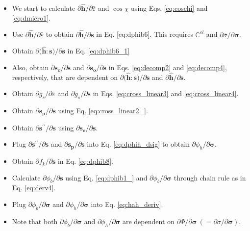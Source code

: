 \documentclass[12pt]{amsart}
\begin{document}
\begin{itemize}
\item We start to calculate $\partial \hat{\mathbf{h}}/\partial \bar{\varepsilon}$ and $\cos\chi$ using Eqs. \ref{eq:coschi} and \ref{eq:dmicro1}.
\item Use $\partial \hat{\mathbf{h}}/\partial \bar{\varepsilon}$ to obtain $\partial \hat{\mathbf{h}}/\partial \mathbf{s}$ in Eq. \ref{eq:dphib6}. This requires $\mathbb{C}^{el}$ and $\partial\bar{\sigma}/\partial\mathbf{\sigma}$.
\item Obtain $\partial\big(\hat{\mathbf{h}}:\mathbf{s}\big)/\partial \mathbf{s}$ in Eq. \ref{eq:dphib6_1}
\item Also, obtain $\partial \mathbf{s_c}/\partial \mathbf{s}$ and $\partial \mathbf{s_o}/\partial\mathbf{s}$ in Eqs. \ref{eq:decomp2} and \ref{eq:decomp4}, respectively, that are dependent on $\partial \big(\hat{\mathbf{h}}:\mathbf{s}\big)/\partial\mathbf{s}$ and $\partial \hat{\mathbf{h}}/\partial\mathbf{s}$.
\item Obtain $\partial g_s/\partial\bar{\varepsilon}$ and $\partial g_s/\partial\mathbf{s}$ in Eqs. \ref{eq:cross_linear3} and \ref{eq:cross_linear4}.
\item Obtain $\partial \mathbf{s_p}/\partial\mathbf{s}$ using Eq. \ref{eq:cross_linear2_}.
\item Obtain $\partial\mathbf{s}^{\prime\prime}/\partial\mathbf{s}$ using $\partial \mathbf{s_c}/\partial \mathbf{s}$.
\item Plug $\partial\mathbf{s}^{\prime\prime}/\partial\mathbf{s}$ and  $\partial \mathbf{s_p}/\partial\mathbf{s}$ into Eq. \ref{eq:dphih_dsig} to obtain $\partial\phi_h/\partial\mathbf{\sigma}$.
\item Obtain $\partial f_k/\partial \mathbf{s}$ in Eq. \ref{eq:dphib8}.
\item Calculate $\partial \phi_b/\partial \mathbf{s}$ using Eq. \ref{eq:dphib1_} and $\partial \phi_b/\partial \mathbf{\sigma}$ through chain rule as in Eq. \ref{eq:derv4}.
\item Plug $\partial \phi_b/\partial\mathbf{\sigma}$ and $\partial\phi_h/\partial\mathbf{\sigma}$ into Eq. \ref{eq:hah_deriv}.
  \item Note that both $\partial \phi_b/\partial\mathbf{\sigma}$ and $\partial\phi_h/\partial\mathbf{\sigma}$ are dependent on $\partial\Phi/\partial\mathbf{\sigma}\ (=\partial\bar{\sigma}/\partial\mathbf{\sigma})$.
\end{itemize}





\newpage


\end{document}
